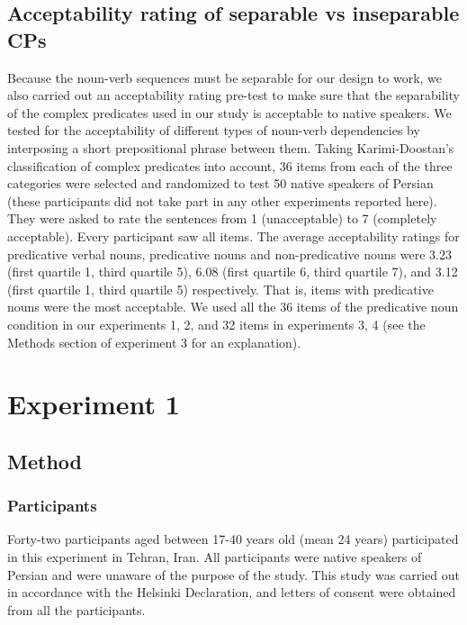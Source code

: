\documentclass{frontiersSCNS}\usepackage{knitr} %
\begin{document}
\subsection{Acceptability rating of separable vs inseparable CPs}

Because the noun-verb sequences must be  separable for our design to work, we also carried out an acceptability rating pre-test to make sure that the separability of the complex predicates used in our study is acceptable to native speakers. We tested for the acceptability of different types of noun-verb dependencies by interposing a short prepositional phrase between them.  
Taking Karimi-Doostan's classification of complex predicates into account,
36 items from each of the three categories were selected and randomized to test 50 native speakers of Persian (these participants did not take part in any other experiments reported here). They were asked to rate the sentences from 1 (unacceptable) to 7 (completely acceptable). 
Every participant saw all items.
The average acceptability ratings for predicative verbal nouns, predicative nouns and non-predicative nouns were 3.23 (first quartile 1, third quartile 5), 6.08 (first quartile 6, third quartile 7), and 3.12 (first quartile 1, third quartile 5) respectively. That is, items with predicative nouns were the most acceptable. 
We used all the 36 items of the predicative noun condition in our experiments 1, 2, and 32 items in experiments 3, 4 (see the Methods section of experiment 3 for an explanation). 

\section{Experiment 1}


\subsection{Method}
\subsubsection{Participants}

Forty-two participants aged between 17-40 years old (mean 24 years) participated in this experiment in Tehran, Iran. All participants were native speakers of Persian and were unaware of the purpose of the study. This study was carried out in accordance with the Helsinki Declaration, and letters of consent were obtained from all the participants.
\end{document}
